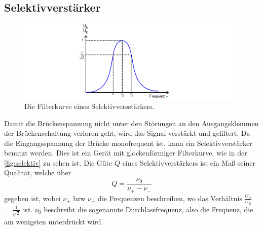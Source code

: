 \subsection{Selektivverstärker}
\begin{figure}
    \centering
    \includegraphics[width=\textwidth]{filterkurve.png}
    \caption{Die Filterkurve eines Selektivversstärkers.\cite{anleitung}}
    \label{fig:selektiv}
\end{figure}
Damit die Brückenspannung nicht unter den Störungen an den Ausgangsklemmen der Brückenschaltung verloren geht, wird das Signal verstärkt und gefiltert.
Da die Eingangsspannung der Brücke monofrequent ist, kann ein Selektivverstärker benutzt werden. 
Dies ist ein Gerät mit glockenförmiger Filterkurve, wie in der \autoref{fig:selektiv} zu sehen ist.
Die Güte $Q$ eines Selektivverstärkers ist ein Maß seiner Qualität, welche über 
\begin{equation*}
    Q = \frac{\nu_0}{\nu_+ - \nu_-}
\end{equation*}
gegeben ist, wobei $\nu_+$ bzw $\nu_-$ die Frequenzen beschreiben, wo das Verhältnis $\frac{U_{\text{A}}}{U_{\text{E}}} $ = $\frac{1}{\sqrt{2}}$ ist.
$\nu_0$ beschreibt die sogenannte Durchlassfrequenz, also die Frequenz, die am wenigsten unterdrückt wird.